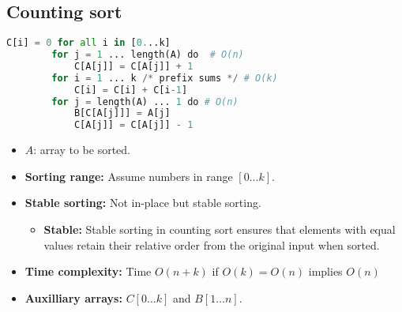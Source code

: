 \subsection{Counting sort}
\begin{definition}
    \begin{lstlisting}[language=Python, caption={Counting Sort Pseudocode}]
        C[i] = 0 for all i in [0...k]
        for j = 1 ... length(A) do  # O(n)
            C[A[j]] = C[A[j]] + 1
        for i = 1 ... k /* prefix sums */ # O(k)
            C[i] = C[i] + C[i-1]
        for j = length(A) ... 1 do # O(n)
            B[C[A[j]]] = A[j]
            C[A[j]] = C[A[j]] - 1 
    \end{lstlisting}
    \begin{itemize}
        \item $A$: array to be sorted. 
        \item \textbf{Sorting range:} Assume numbers in range $[0...k]$.
        \item \textbf{Stable sorting:} Not in-place but stable sorting. 
        \begin{itemize}
            \item \textbf{Stable:} Stable sorting in counting sort ensures that elements with equal values retain their relative order from the original input when sorted.
        \end{itemize}
        \item \textbf{Time complexity:} Time $O(n+k)$ if $O(k) = O(n)$ implies $O(n)$
        \item \textbf{Auxilliary arrays:} $C [0\ldots k]$ and $B [1 \ldots n]$.
    \end{itemize}
\end{definition}

